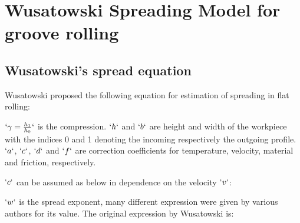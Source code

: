 \hypertarget{wusatowski-spreading-model-for-groove-rolling}{%
\section{Wusatowski Spreading Model for groove
rolling}\label{wusatowski-spreading-model-for-groove-rolling}}

\hypertarget{wusatowskis-spread-equation}{%
\subsection{Wusatowski's spread
equation}\label{wusatowskis-spread-equation}}

Wusatowski proposed the following equation for estimation of spreading
in flat rolling:

\begin{Shaded}
\begin{Highlighting}[]
\end{Highlighting}
\end{Shaded}

\(`\gamma = \frac{h_1}{h_0}`\) is the compression. \(`h`\) and \(`b`\)
are height and width of the workpiece with the indices 0 and 1 denoting
the incoming respectively the outgoing profile. \(`a`\), \(`c`\),
\(`d`\) and \(`f`\) are correction coefficients for temperature,
velocity, material and friction, respectively.

\(`c`\) can be assumed as below in dependence on the velocity \(`v`\):

\begin{Shaded}
\begin{Highlighting}[]
\end{Highlighting}
\end{Shaded}

\(`w`\) is the spread exponent, many different expression were given by
various authors for its value. The original expression by Wusatowski is:

\begin{Shaded}
\begin{Highlighting}[]
\end{Highlighting}
\end{Shaded}

